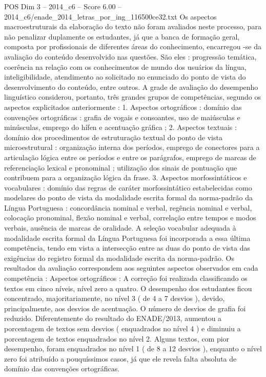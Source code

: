 \begin{textsample}{POS Dim 3 – 2014\_c6 – Score 6.00 – 2014\_c6/enade\_2014\_letras\_por\_ing\_116500ce32.txt}
Os aspectos macroestruturais da elaboração do texto não foram avaliados neste processo, para não penalizar duplamente os estudantes, já que a banca de formação geral, composta por profissionais de diferentes áreas do conhecimento, encarregou -se da avaliação do conteúdo desenvolvido nas questões.
São eles : progressão temática, coerência na relação com os conhecimentos de mundo dos usuários da língua, inteligibilidade, atendimento ao solicitado no enunciado do ponto de vista do desenvolvimento do conteúdo, entre outros.
A grade de avaliação do desempenho linguístico considerou, portanto, três grandes grupos de competências, segundo os aspectos explicitados anteriormente : 1.
Aspectos ortográficos : domínio das convenções ortográficas : grafia de vogais e consoantes, uso de maiúsculas e minúsculas, emprego do hífen e acentuação gráfica ; 2.
Aspectos textuais : domínio dos procedimentos de estruturação textual do ponto de vista microestrutural : organização interna dos períodos, emprego de conectores para a articulação lógica entre os períodos e entre os parágrafos, emprego de marcas de referenciação lexical e pronominal ; utilização dos sinais de pontuação que contribuem para a organização lógica da frase. 3.
Aspectos morfossintáticos e vocabulares : domínio das regras de caráter morfossintático estabelecidas como modelares do ponto de vista da modalidade escrita formal da norma-padrão da Língua Portuguesa : concordância nominal e verbal, regência nominal e verbal, colocação pronominal, flexão nominal e verbal, correlação entre tempos e modos verbais, ausência de marcas de oralidade.
A seleção vocabular adequada à modalidade escrita formal da Língua Portuguesa foi incorporada a essa última competência, tendo em vista a intersecção entre as duas do ponto de vista das exigências do registro formal da modalidade escrita da norma-padrão.
Os resultados da avaliação correspondem aos seguintes aspectos observados em cada competência : Aspectos ortográficos : A correção foi realizada classificando os textos em cinco níveis, nível zero a quatro.
O desempenho dos estudantes ficou concentrado, majoritariamente, no nível 3 ( de 4 a 7 desvios ), devido, principalmente, aos desvios de acentuação.
O número de desvios de grafia foi reduzido.
Diferentemente do resultado do ENADE/2013, aumentou a porcentagem de textos sem desvios ( enquadrados no nível 4 ) e diminuiu a porcentagem de textos enquadrados no nível 2.
Alguns textos, com pior desempenho, foram enquadrados no nível 1 ( de 8 a 12 desvios ), enquanto o nível zero foi atribuído a pouquíssimos casos, já que ele revela falta absoluta de domínio das convenções ortográficas.

\end{textsample}
